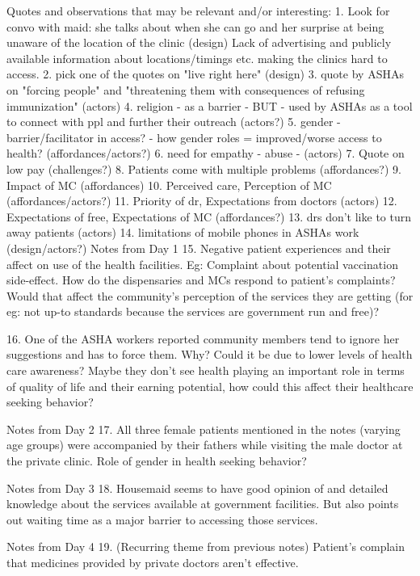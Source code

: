 Quotes and observations that may be relevant and/or interesting:
1. Look for convo with maid: she talks about when she can go and her surprise at being unaware of the location of the clinic (design)
Lack of advertising and publicly available information about locations/timings etc.  making the clinics hard to access.
2. pick one of the quotes on "live right here" (design)
3. quote by ASHAs on "forcing people" and "threatening them with consequences of refusing immunization" (actors)
4. religion - as a barrier - BUT - used by ASHAs as a tool to connect with ppl and further their outreach (actors?)
5. gender - barrier/facilitator in access? - how gender roles = improved/worse access to health? (affordances/actors?)
6. need for empathy - abuse - (actors) 
7. Quote on low pay (challenges?)
8. Patients come with multiple problems (affordances?)
9. Impact of MC (affordances)
10. Perceived care, Perception of MC (affordances/actors?)
11. Priority of dr, Expectations from doctors (actors)
12. Expectations of free, Expectations of MC (affordances?)
13. drs don't like to turn away patients (actors)
14. limitations of mobile phones in ASHAs work (design/actors?)
Notes from Day 1
15. Negative patient experiences and their affect on use of the health facilities. Eg: Complaint about potential vaccination side-effect. How do the dispensaries and MCs respond to patient's complaints? Would that affect the community's perception of the services they are getting (for eg: not up-to standards because the services are government run and free)? 

16. One of the ASHA workers reported community members tend to ignore her suggestions and has to force them. Why? Could it be due to lower levels of health care awareness? Maybe they don't see health playing an important role in terms of quality of life and their earning potential, how could this affect their healthcare seeking behavior? 

Notes from Day 2
17. All three female patients mentioned in the notes (varying age groups) were accompanied by their fathers while visiting the male doctor at the private clinic. Role of gender in health seeking behavior?

Notes from Day 3
18. Housemaid seems to have good opinion of and detailed knowledge about the services available at government facilities. But also points out waiting time as a major barrier to accessing those services.

Notes from Day 4
19. (Recurring theme from previous notes) Patient's complain that medicines provided by private doctors aren't effective. 

